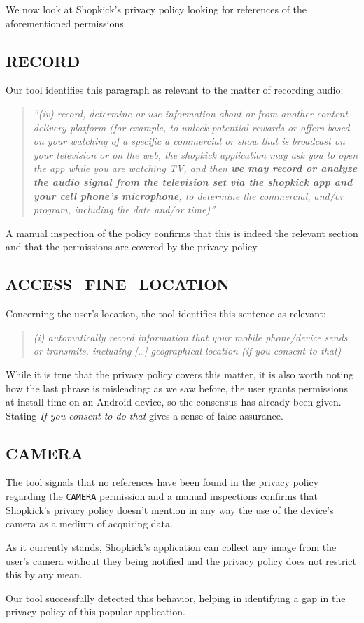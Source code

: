 We now look at Shopkick's privacy policy looking for references of the aforementioned permissions.

\subsection{RECORD}
Our tool identifies this paragraph as relevant to the matter of recording audio:

\begin{quote}
{\emph{``(iv) record, determine or use information about or from another content delivery platform (for example, to unlock potential rewards or offers based on your watching of a specific a commercial or show that is broadcast on your television or on the web, the shopkick application may ask you to open the app while you are watching TV, and then \textbf{we may record or analyze the audio signal from the television set via the shopkick app and your cell phone's microphone}, to determine the commercial, and/or program, including the date and/or time)''}}\cite{shopkick}
\end{quote}

A manual inspection of the policy confirms that this is indeed the relevant section and that the permissions are covered by the privacy policy.

\subsection{ACCESS\_FINE\_LOCATION}
Concerning the user's location, the tool identifies this sentence as relevant:

\begin{quote}
{\emph{(i) automatically record information that your mobile phone/device sends or transmits, including […] geographical location (if you consent to that)}}
\end{quote}

While it is true that the privacy policy covers this matter, it is also worth noting how the last phrase is misleading: as we saw before, the user grants permissions at install time on an Android device, so the consensus has already been given. Stating \emph{If you consent to do that} gives a sense of false assurance.

\subsection{CAMERA}
The tool signals that no references have been found in the privacy policy regarding the \texttt{CAMERA} permission and a manual inspections confirms that Shopkick's privacy policy doesn't mention in any way the use of the device's camera as a medium of acquiring data.

As it currently stands, Shopkick's application can collect any image from the user's camera without they being notified and the privacy policy does not restrict this by any mean.

Our tool successfully detected this behavior, helping in identifying a gap in the privacy policy of this popular application.